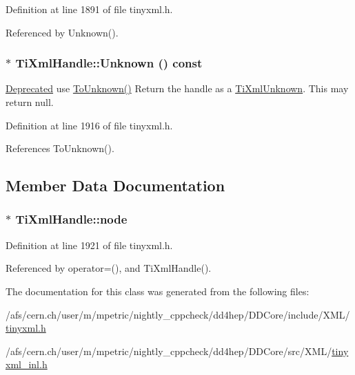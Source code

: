 Definition at line 1891 of file tinyxml.h.

Referenced by Unknown().\hypertarget{class_ti_xml_handle_a49675b74357ba2aae124657a9a1ef465}{
\subsubsection[{Unknown}]{$\ast$ TiXmlHandle::Unknown () const}}
\label{class_ti_xml_handle_a49675b74357ba2aae124657a9a1ef465}
\begin{Desc}
\item[\hyperlink{deprecated__deprecated000005}{Deprecated}]use \hyperlink{class_ti_xml_handle_a1381c17507a130767b1e23afc93b3674}{ToUnknown()} Return the handle as a \hyperlink{class_ti_xml_unknown}{TiXmlUnknown}. This may return null. \end{Desc}


Definition at line 1916 of file tinyxml.h.

References ToUnknown().

\subsection{Member Data Documentation}
\hypertarget{class_ti_xml_handle_ac5429de14bb78b16288bac5bf33c6858}{
\subsubsection[{node}]{$\ast$ {\bf TiXmlHandle::node}}}
\label{class_ti_xml_handle_ac5429de14bb78b16288bac5bf33c6858}


Definition at line 1921 of file tinyxml.h.

Referenced by operator=(), and TiXmlHandle().

The documentation for this class was generated from the following files:\begin{DoxyCompactItemize}
\item 
/afs/cern.ch/user/m/mpetric/nightly\_\-cppcheck/dd4hep/DDCore/include/XML/\hyperlink{tinyxml_8h}{tinyxml.h}\item 
/afs/cern.ch/user/m/mpetric/nightly\_\-cppcheck/dd4hep/DDCore/src/XML/\hyperlink{tinyxml__inl_8h}{tinyxml\_\-inl.h}\end{DoxyCompactItemize}
